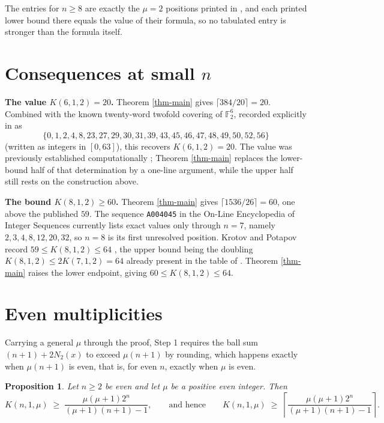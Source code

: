 \documentclass[10pt,a4paper]{article}
\newtheorem{proposition}{Proposition}[section]
\begin{document}
The entries for $n\ge 8$ are exactly the $\mu=2$ positions printed in
\cite{KP-2021}, and each printed lower bound there equals the value of their
formula, so no tabulated entry is stronger than the formula itself.

\section{Consequences at small $n$}\label{sec-small}

\textbf{The value $K(6,1,2)=20$.} Theorem \ref{thm-main} gives
$\lceil 384/20\rceil=20$. Combined with the known twenty-word twofold covering
of $\mathbb{F}_2^6$, recorded explicitly in \cite{OEIS-A004045} as
\[
  \{0,1,2,4,8,23,27,29,30,31,39,43,45,46,47,48,49,50,52,56\}
\]
(written as integers in $[0,63]$), this recovers $K(6,1,2)=20$. The value was
previously established computationally \cite{Seuranen-2007}; Theorem
\ref{thm-main} replaces the lower-bound half of that determination by a
one-line argument, while the upper half still rests on the construction above.

\textbf{The bound $K(8,1,2)\ge 60$.} Theorem \ref{thm-main} gives
$\lceil 1536/26\rceil = 60$, one above the published $59$. The sequence
\texttt{A004045} in the On-Line Encyclopedia of Integer Sequences
\cite{OEIS-A004045} currently lists exact values only through $n=7$, namely
$2,3,4,8,12,20,32$, so $n=8$ is its first unresolved position. Krotov and
Potapov record $59\le K(8,1,2)\le 64$ \cite{KP-2021}, the upper bound being the
doubling $K(8,1,2)\le 2K(7,1,2)=64$ already present in the table of
\cite{HHKL-1993}. Theorem \ref{thm-main} raises the lower endpoint, giving
$60\le K(8,1,2)\le 64$.

\section{Even multiplicities}\label{sec-mu}

Carrying a general $\mu$ through the proof, Step 1 requires the ball sum
$(n+1)+2N_2(x)$ to exceed $\mu(n+1)$ by rounding, which happens exactly when
$\mu(n+1)$ is even, that is, for even $n$, exactly when $\mu$ is even.

\begin{proposition}\label{prop-mu}
Let $n\ge 2$ be even and let $\mu$ be a positive even integer. Then
\[
  K(n,1,\mu)\;\ge\;\frac{\mu(\mu+1)2^n}{(\mu+1)(n+1)-1},
  \qquad\text{and hence}\qquad
  K(n,1,\mu)\;\ge\;\left\lceil\frac{\mu(\mu+1)2^n}{(\mu+1)(n+1)-1}\right\rceil .
\]
\end{proposition}
\end{document}
